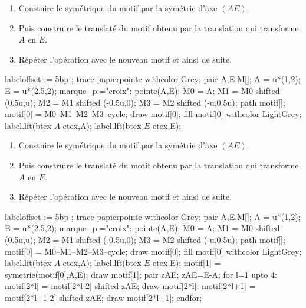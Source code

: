 \begin{exercice*}    
    \begin{enumerate}
        \item Constuire le symétrique du motif par la symétrie d'axe $(AE)$.
        \item Puis construire le translaté du motif obtenu par la translation qui transforme $A$ en $E$.
        \item Répéter l'opération avec le nouveau motif et ainsi de suite.
    \end{enumerate}
    \begin{Geometrie}[CoinHD={(9u,4u)}]
        labeloffset := 5bp ;
        trace papierpointe withcolor Grey;
        pair A,E,M[];
        A = u*(1,2);
        E = u*(2.5,2);
        marque_p:="croix";
        pointe(A,E);
        M0 = A;
        M1 = M0 shifted (0.5u,u);
        M2 = M1 shifted (-0.5u,0);
        M3 = M2 shifted (-u,0.5u);
        path motif[];
        motif[0] = M0--M1--M2--M3--cycle;
        draw motif[0];
        fill motif[0] withcolor LightGrey;
        label.lft(btex $A$ etex,A);
        label.lft(btex $E$ etex,E);           
    \end{Geometrie}
\end{exercice*}
\begin{corrige}
    \begin{enumerate}
        \item Constuire le symétrique du motif par la symétrie d'axe $(AE)$.
        \item Puis construire le translaté du motif obtenu par la translation qui transforme $A$ en $E$.
        \item Répéter l'opération avec le nouveau motif et ainsi de suite.
    \end{enumerate}
    \begin{Geometrie}[CoinHD={(9u,4u)}]
        labeloffset := 5bp ;
        trace papierpointe withcolor Grey;
        pair A,E,M[];
        A = u*(1,2);
        E = u*(2.5,2);
        marque_p:="croix";
        pointe(A,E);
        M0 = A;
        M1 = M0 shifted (0.5u,u);
        M2 = M1 shifted (-0.5u,0);
        M3 = M2 shifted (-u,0.5u);
        path motif[];
        motif[0] = M0--M1--M2--M3--cycle;
        draw motif[0];
        fill motif[0] withcolor LightGrey;
        label.lft(btex $A$ etex,A);
        label.lft(btex $E$ etex,E);
        motif[1] = symetrie(motif[0],A,E);
        draw motif[1];        
        pair zAE;
        zAE=E-A;
        for l=1 upto 4:
            motif[2*l] = motif[2*l-2] shifted zAE;
            draw motif[2*l];
            motif[2*l+1] = motif[2*l+1-2] shifted zAE;
            draw motif[2*l+1];
        endfor;            
    \end{Geometrie}
\end{corrige}

